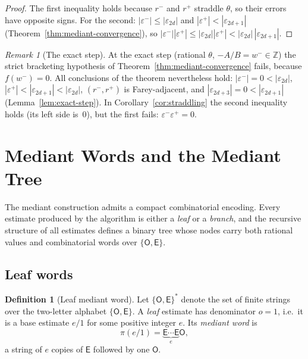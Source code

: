 \documentclass[12pt]{article}
\theoremstyle{definition}
\newtheorem{definition}[theorem]{Definition}
\theoremstyle{remark}
\newtheorem{remark}[theorem]{Remark}
\theoremstyle{plain}
\newcommand{\eps}{\varepsilon}
\newcommand{\OO}{\mathsf{O}}
\newcommand{\EE}{\mathsf{E}}
\newcommand{\wminus}{w^{-}}
\newcommand{\rplus}{r^{+}}
\newcommand{\rminus}{r^{-}}
\newcommand{\epsplus}{\eps^{+}}
\newcommand{\epsminus}{\eps^{-}}
\begin{document}
\begin{proof}
The first inequality holds because $\rminus$ and $\rplus$ straddle $\theta$, so their errors
have opposite signs.
For the second: $|\epsminus| \leq |\eps_{2d}|$ and $|\epsplus| < |\eps_{2d+1}|$
(Theorem~\ref{thm:mediant-convergence}), so
$|\epsminus||\epsplus| \leq |\eps_{2d}||\epsplus| < |\eps_{2d}|\,|\eps_{2d+1}|$.
\end{proof}

\begin{remark}[The exact step]\label{rem:exact-step-med}
At the exact step (rational $\theta$, $-A/B = \wminus \in \mathbb{Z}$) the strict
bracketing hypothesis of Theorem~\ref{thm:mediant-convergence} fails, because
$f(\wminus) = 0$.  All conclusions of the theorem nevertheless hold: $|\epsminus| = 0 <
|\eps_{2d}|$, $|\epsplus| < |\eps_{2d+1}| < |\eps_{2d}|$, $(\rminus, \rplus)$ is
Farey-adjacent, and $|\eps_{2d+3}| = 0 < |\eps_{2d+1}|$
(Lemma~\ref{lem:exact-step}).
In Corollary~\ref{cor:straddling} the second inequality holds (its left side is~$0$),
but the first fails: $\epsminus\epsplus = 0$.
\end{remark}

\section{Mediant Words and the Mediant Tree}
\label{sec:parity}

The mediant construction admits a compact combinatorial encoding.
Every estimate produced by the algorithm is either a \emph{leaf} or a \emph{branch},
and the recursive structure of all estimates defines a binary tree whose nodes carry
both rational values and combinatorial words over $\{\OO, \EE\}$.

\subsection{Leaf words}
\label{sec:parity-leaf}

\begin{definition}[Leaf mediant word]
\label{def:parity-alphabet}
Let $\{\OO, \EE\}^*$ denote the set of finite strings over the two-letter alphabet
$\{\OO, \EE\}$.
A \emph{leaf} estimate has denominator $o = 1$, i.e.\ it is a base estimate $e/1$
for some positive integer $e$.
Its \emph{mediant word} is
\[
  \pi(e/1) = \underbrace{\EE \cdots \EE}_{e} \OO,
\]
a string of $e$ copies of $\EE$ followed by one $\OO$.
\end{definition}
\end{document}

